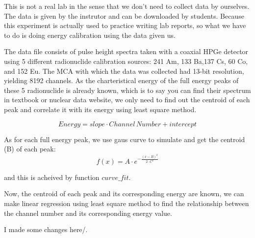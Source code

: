 This is not a real lab in the sense that we don't need to collect data by ourselves. The data is given by the instrutor and can be downloaded by students. Because this experiment is actually used to practice writing lab reports, so what we have to do is doing energy calibration using the data given us.

The data file consists of pulse height spectra taken with a coaxial HPGe detector using 5 different radionuclide calibration sources: 241 Am, 133 Ba,137 Cs, 60 Co, and 152 Eu. The MCA with which the data was collected had 13-bit resolution, yielding 8192 channels. As the charteristical energy of the full energy peaks of these 5 radionuclide is already known, which is to say you can find their spectrum in textbook or nuclear data website, we only need to find out the centroid of each peak and correlate it with its energy using least square method.


\[Energy=slope\cdot Channel\,Number + intercept\]

As for each full energy peak, we use gaus curve to simulate and get the centroid (B) of each peak:
\[f\left( x \right) = A \cdot {e^{ - \frac{{{{\left( {x - B} \right)}^2}}}{{2 \cdot {C^2}}}}}\]

and this is acheived by function $curve\_fit$.

Now, the centroid of each peak and its corresponding energy are known, we can make linear regression using least square method to find the relationship between the channel number and its corresponding energy value.

I made some changes here/.


